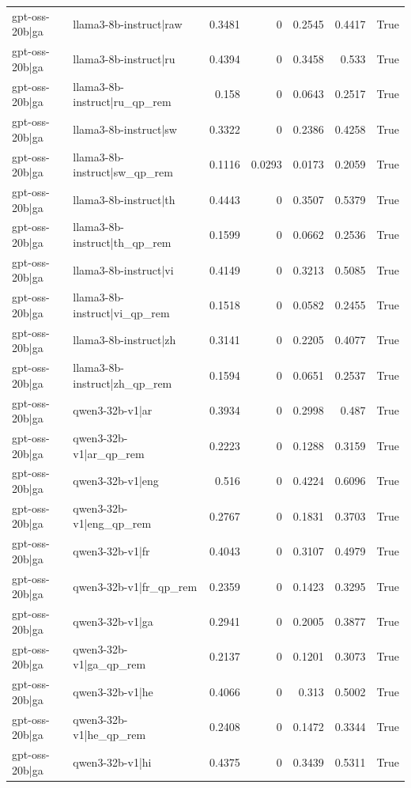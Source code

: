 \begin{table}
\begin{tabular}{l l r r r r l}
gpt-oss-20b|ga & llama3-8b-instruct|raw & 0.3481 & 0 & 0.2545 & 0.4417 & True \\
gpt-oss-20b|ga & llama3-8b-instruct|ru & 0.4394 & 0 & 0.3458 & 0.533 & True \\
gpt-oss-20b|ga & llama3-8b-instruct|ru_qp_rem & 0.158 & 0 & 0.0643 & 0.2517 & True \\
gpt-oss-20b|ga & llama3-8b-instruct|sw & 0.3322 & 0 & 0.2386 & 0.4258 & True \\
gpt-oss-20b|ga & llama3-8b-instruct|sw_qp_rem & 0.1116 & 0.0293 & 0.0173 & 0.2059 & True \\
gpt-oss-20b|ga & llama3-8b-instruct|th & 0.4443 & 0 & 0.3507 & 0.5379 & True \\
gpt-oss-20b|ga & llama3-8b-instruct|th_qp_rem & 0.1599 & 0 & 0.0662 & 0.2536 & True \\
gpt-oss-20b|ga & llama3-8b-instruct|vi & 0.4149 & 0 & 0.3213 & 0.5085 & True \\
gpt-oss-20b|ga & llama3-8b-instruct|vi_qp_rem & 0.1518 & 0 & 0.0582 & 0.2455 & True \\
gpt-oss-20b|ga & llama3-8b-instruct|zh & 0.3141 & 0 & 0.2205 & 0.4077 & True \\
gpt-oss-20b|ga & llama3-8b-instruct|zh_qp_rem & 0.1594 & 0 & 0.0651 & 0.2537 & True \\
gpt-oss-20b|ga & qwen3-32b-v1|ar & 0.3934 & 0 & 0.2998 & 0.487 & True \\
gpt-oss-20b|ga & qwen3-32b-v1|ar_qp_rem & 0.2223 & 0 & 0.1288 & 0.3159 & True \\
gpt-oss-20b|ga & qwen3-32b-v1|eng & 0.516 & 0 & 0.4224 & 0.6096 & True \\
gpt-oss-20b|ga & qwen3-32b-v1|eng_qp_rem & 0.2767 & 0 & 0.1831 & 0.3703 & True \\
gpt-oss-20b|ga & qwen3-32b-v1|fr & 0.4043 & 0 & 0.3107 & 0.4979 & True \\
gpt-oss-20b|ga & qwen3-32b-v1|fr_qp_rem & 0.2359 & 0 & 0.1423 & 0.3295 & True \\
gpt-oss-20b|ga & qwen3-32b-v1|ga & 0.2941 & 0 & 0.2005 & 0.3877 & True \\
gpt-oss-20b|ga & qwen3-32b-v1|ga_qp_rem & 0.2137 & 0 & 0.1201 & 0.3073 & True \\
gpt-oss-20b|ga & qwen3-32b-v1|he & 0.4066 & 0 & 0.313 & 0.5002 & True \\
gpt-oss-20b|ga & qwen3-32b-v1|he_qp_rem & 0.2408 & 0 & 0.1472 & 0.3344 & True \\
gpt-oss-20b|ga & qwen3-32b-v1|hi & 0.4375 & 0 & 0.3439 & 0.5311 & True \\

\end{tabular}
\end{table}
